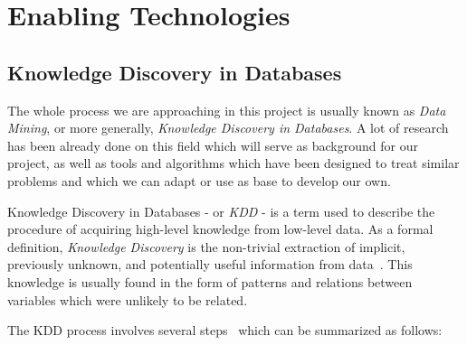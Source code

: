 \chapter{Enabling Technologies}
\label{chap:enabling_technologies}
\section{Knowledge Discovery in Databases}
\label{sec:kdd}
The whole process we are approaching in this project is usually known as \emph{Data Mining}, or more generally, \emph{Knowledge Discovery in Databases}. A lot of research has been already done on this field which will serve as background for our project, as well as tools and algorithms which have been designed to treat similar problems and which we can adapt or use as base to develop our own\cite{chen1996data, fayyad1996kdd}.

Knowledge Discovery in Databases - or \emph{KDD} - is a term used to describe the procedure of acquiring high-level knowledge from low-level data. As a formal definition, \emph{Knowledge Discovery} is the non-trivial extraction of implicit, previously unknown, and potentially useful information from data~\cite{frawley1992knowledge}. This knowledge is usually found in the form of patterns and relations between variables which were unlikely to be related.

The KDD process involves several steps~\cite{feyyad1996data} which can be summarized as follows:

